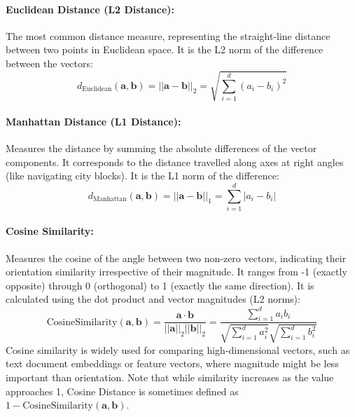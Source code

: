 \begin{appendices}
  \paragraph{Euclidean Distance (L2 Distance):}
  \label{eq:euclidean_distance}
  The most common distance measure, representing the straight-line distance between two points in Euclidean space. It is the L2 norm of the difference between the vectors:
  \begin{equation}
    d_{\text{Euclidean}}(\bm{a}, \bm{b}) = ||\bm{a} - \bm{b}||_2 = \sqrt{\sum_{i=1}^d (a_i - b_i)^2}
  \end{equation}

  \paragraph{Manhattan Distance (L1 Distance):}
  Measures the distance by summing the absolute differences of the vector components. It corresponds to the distance travelled along axes at right angles (like navigating city blocks). It is the L1 norm of the difference:
  \begin{equation}
    d_{\text{Manhattan}}(\bm{a}, \bm{b}) = ||\bm{a} - \bm{b}||_1 = \sum_{i=1}^d |a_i - b_i|
  \end{equation}

  \paragraph{Cosine Similarity:}
  Measures the cosine of the angle between two non-zero vectors, indicating their orientation similarity irrespective of their magnitude. It ranges from -1 (exactly opposite) through 0 (orthogonal) to 1 (exactly the same direction). It is calculated using the dot product and vector magnitudes (L2 norms):
  \begin{equation}
    \text{CosineSimilarity}(\bm{a}, \bm{b}) = \frac{\bm{a} \cdot \bm{b}}{||\bm{a}||_2 ||\bm{b}||_2} = \frac{\sum_{i=1}^d a_i b_i}{\sqrt{\sum_{i=1}^d a_i^2} \sqrt{\sum_{i=1}^d b_i^2}}
  \end{equation}
  Cosine similarity is widely used for comparing high-dimensional vectors, such as text document embeddings or feature vectors, where magnitude might be less important than orientation. Note that while similarity increases as the value approaches 1, Cosine Distance is sometimes defined as \( 1 - \text{CosineSimilarity}(\bm{a}, \bm{b}) \).


\end{appendices}
